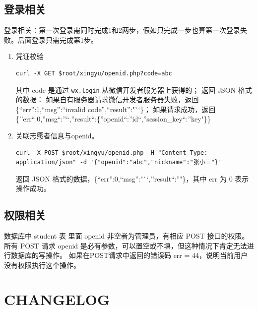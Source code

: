 \documentclass[]{ctexart}
\begin{document}
\hypertarget{ux767bux5f55ux76f8ux5173}{%
\subsection{登录相关}\label{ux767bux5f55ux76f8ux5173}}

登录相关：第一次登录需同时完成1和2两步，假如只完成一步也算第一次登录失败。后面登录只需完成第1步。
\begin{enumerate}
\item 凭证校验

\begin{lstlisting}
curl -X GET $root/xingyu/openid.php?code=abc
\end{lstlisting}

其中 code 是通过 \texttt{wx.login} 从微信开发者服务器上获得的； 返回
JSON 格式的数据： 如果自有服务器请求微信开发者服务器失败，返回
\{``err'':1,``msg'':``invalid code'',``result'':"``\}；
如果请求成功，返回
\{''err``:0,''msg``:''``,''result``:\{''openid``:''id``,''session\_key``:''key"\}\}


\item 关联志愿者信息与openid。
\begin{lstlisting}
curl -X POST $root/xingyu/openid.php -H "Content-Type: application/json" -d '{"openid":"abc","nickname":"张小三"}'
\end{lstlisting}

返回 JSON 格式的数据，\{``err'':0,``msg'':"``,''result``:''"\}，其中 err
为 0 表示操作成功。
\end{enumerate}
\hypertarget{ux6743ux9650ux76f8ux5173}{%
\subsection{权限相关}\label{ux6743ux9650ux76f8ux5173}}

数据库中 student 表 里面 openid 非空者为管理员，有相应 POST 接口的权限。
所有 POST 请求 openid
是必有参数，可以置空或不填，但这种情况下肯定无法进行数据库的写操作。
如果在POST请求中返回的错误码 err =
44，说明当前用户没有权限执行这个操作。

\hypertarget{changelog}{%
\section{CHANGELOG}\label{changelog}}
\end{document}
